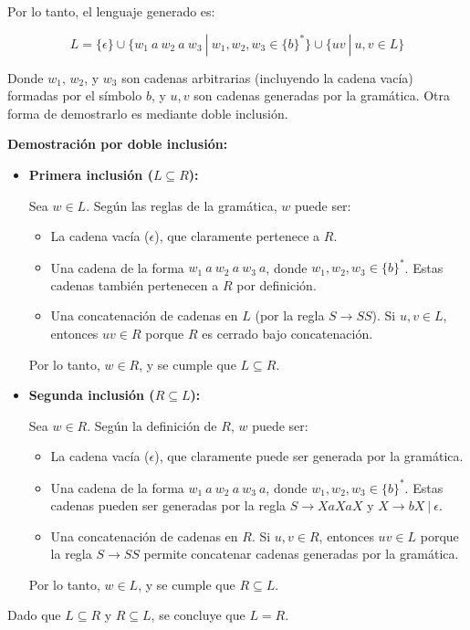 \documentclass[12pt]{book} %
\begin{document}
\begin{enumerate}
\begin{solucion}[Ejercicio 1.d]
   Por lo tanto, el lenguaje generado es:

   $$
   L = \{ \epsilon \} \cup \{ w_1 \ a \ w_2 \ a \ w_3  \ | \ w_1, w_2, w_3 \in \{b\}^* \} \cup \{ uv \ | \ u, v \in L \}
   $$

   Donde $w_1$, $w_2$, y $w_3$ son cadenas arbitrarias (incluyendo la cadena vacía) formadas por el símbolo $b$, y $u, v$ son cadenas generadas por la gramática. Otra forma de demostrarlo es mediante doble inclusión.

   \textbf{Demostración por doble inclusión:}

   \begin{itemize}
       \item \textbf{Primera inclusión ($L \subseteq R$):}

           Sea $w \in L$. Según las reglas de la gramática, $w$ puede ser:
           \begin{itemize}
               \item La cadena vacía ($\epsilon$), que claramente pertenece a $R$.
               \item Una cadena de la forma $w_1 \ a \ w_2 \ a \ w_3 \ a$, donde $w_1, w_2, w_3 \in \{b\}^*$. Estas cadenas también pertenecen a $R$ por definición.
               \item Una concatenación de cadenas en $L$ (por la regla $S \to SS$). Si $u, v \in L$, entonces $uv \in R$ porque $R$ es cerrado bajo concatenación.
           \end{itemize}

           Por lo tanto, $w \in R$, y se cumple que $L \subseteq R$.

       \item \textbf{Segunda inclusión ($R \subseteq L$):}

           Sea $w \in R$. Según la definición de $R$, $w$ puede ser:
           \begin{itemize}
               \item La cadena vacía ($\epsilon$), que claramente puede ser generada por la gramática.
               \item Una cadena de la forma $w_1 \ a \ w_2 \ a \ w_3 \ a$, donde $w_1, w_2, w_3 \in \{b\}^*$. Estas cadenas pueden ser generadas por la regla $S \to XaXaX$ y $X \to bX \ | \ \epsilon$.
               \item Una concatenación de cadenas en $R$. Si $u, v \in R$, entonces $uv \in L$ porque la regla $S \to SS$ permite concatenar cadenas generadas por la gramática.
           \end{itemize}

           Por lo tanto, $w \in L$, y se cumple que $R \subseteq L$.
   \end{itemize}

   Dado que $L \subseteq R$ y $R \subseteq L$, se concluye que $L = R$.

   \end{solucion}
\end{enumerate}
\end{document}
